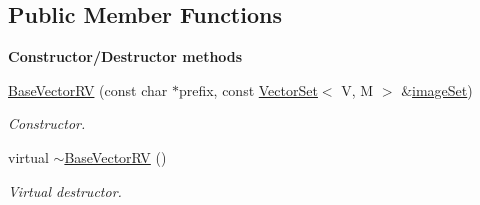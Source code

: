 \subsection*{Public Member Functions}
\begin{Indent}{\bf Constructor/\-Destructor methods}\par
\begin{DoxyCompactItemize}
\item 
\hyperlink{class_q_u_e_s_o_1_1_base_vector_r_v_a2254158741e63815277dd40541780015}{Base\-Vector\-R\-V} (const char $\ast$prefix, const \hyperlink{class_q_u_e_s_o_1_1_vector_set}{Vector\-Set}$<$ V, M $>$ \&\hyperlink{class_q_u_e_s_o_1_1_base_vector_r_v_aa4dd2f036228eac1f945bacc7147a922}{image\-Set})
\begin{DoxyCompactList}\small\item\em Constructor. \end{DoxyCompactList}\item 
virtual \hyperlink{class_q_u_e_s_o_1_1_base_vector_r_v_a4a57ee3ddec5b40ed0ad262f7482b0ae}{$\sim$\-Base\-Vector\-R\-V} ()
\begin{DoxyCompactList}\small\item\em Virtual destructor. \end{DoxyCompactList}\end{DoxyCompactItemize}
\end{Indent}
